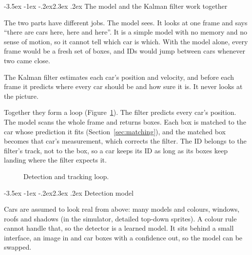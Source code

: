 \documentclass[11pt]{article}
\makeatletter
\renewcommand\section{\@startsection{section}{1}{\z@}%
  {-3.5ex \@plus -1ex \@minus -.2ex}{2.3ex \@plus .2ex}%
  {\normalfont\Large\bfseries\color{accent}}}
\makeatother
\begin{document}
\section{The model and the Kalman filter work together}
\label{sec:loop}

The two parts have different jobs. The model sees. It looks at one frame and
says ``there are cars here, here and here''. It is a simple model with no
memory and no sense of motion, so it cannot tell which car is which. With
the model alone, every frame would be a fresh set of boxes, and IDs would
jump between cars whenever two came close.

The Kalman filter estimates each car's position and velocity, and before
each frame it predicts where every car should be and how sure it is. It
never looks at the picture.

Together they form a loop (Figure~\ref{fig:loop}). The filter predicts every
car's position. The model scans the whole frame and returns boxes. Each box
is matched to the car whose prediction it fits
(Section~\ref{sec:matching}), and the matched box becomes that car's
measurement, which corrects the filter. The ID belongs to the filter's
track, not to the box, so a car keeps its ID as long as its boxes keep
landing where the filter expects it.

\begin{figure}[htbp]
\centering
{}
\caption{Detection and tracking loop.}
\label{fig:loop}
\end{figure}

\section{Detection model}

Cars are assumed to look real from above: many models and colours, windows,
roofs and shadows (in the simulator, detailed top-down sprites). A colour
rule cannot handle that, so the detector is a learned model. It sits behind
a small interface, an image in and car boxes with a confidence out, so the
model can be swapped.
\end{document}
